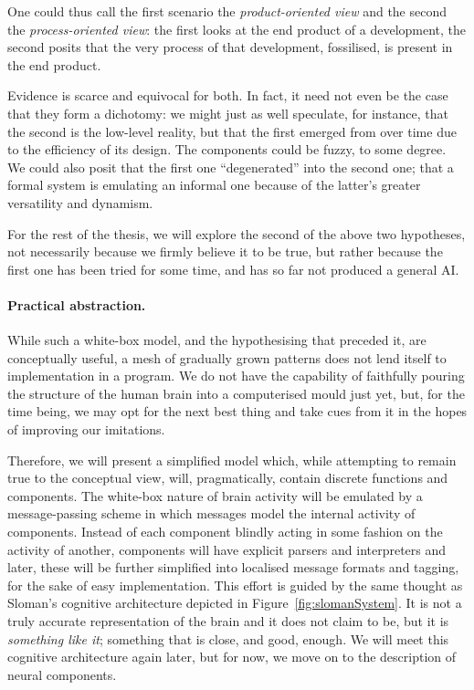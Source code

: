 One could thus call the first scenario the \emph{product-oriented view} and the second the \emph{ process-oriented view}: the first looks at the end product of a development, the second posits that the very process of that development, fossilised, is present in the end product.

Evidence is scarce and equivocal for both. In fact, it need not even be the case that they form a dichotomy: we might just as well speculate, for instance, that the second is the low-level reality, but that the first emerged from over time due to the efficiency of its design. The components could be fuzzy, to some degree. We could also posit that the first one ``degenerated'' into the second one; that a formal system is emulating an informal one because of the latter's greater versatility and dynamism.

For the rest of the thesis, we will explore the second of the above two hypotheses, not necessarily because we firmly believe it to be true, but rather because the first one has been tried for some time, and has so far not produced a general AI.

\paragraph{Practical abstraction.} While such a white-box model, and the hypothesising that preceded it, are conceptually useful, a mesh of gradually grown patterns does not lend itself to implementation in a program. We do not have the capability of faithfully pouring the structure of the human brain into a computerised mould just yet, but, for the time being, we may opt for the next best thing and take cues from it in the hopes of improving our imitations.

Therefore, we will present a simplified model which, while attempting to remain true to the conceptual view, will, pragmatically, contain discrete functions and components. The white-box nature of brain activity will be emulated by a message-passing scheme in which messages model the internal activity of components. Instead of each component blindly acting in some fashion on the activity of another, components will have explicit parsers and interpreters and later, these will be further simplified into localised message formats and tagging, for the sake of easy implementation.
This effort is guided by the same thought as Sloman's cognitive architecture depicted in Figure~\ref{fig:slomanSystem}. It is not a truly accurate representation of the brain and it does not claim to be, but it is {\em something like it}; something that is close, and good, enough. We will meet this cognitive architecture again later, but for now, we move on to the description of neural components.

